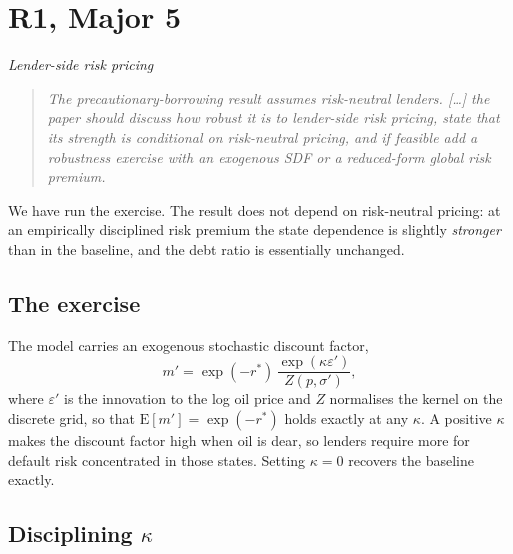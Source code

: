 
\section{R1, Major 5}
{\itshape Lender-side risk pricing}

\begin{quote}\itshape
The precautionary-borrowing result assumes risk-neutral lenders. [\ldots] the
paper should discuss how robust it is to lender-side risk pricing, state that
its strength is conditional on risk-neutral pricing, and if feasible add a
robustness exercise with an exogenous SDF or a reduced-form global risk premium.
\end{quote}

We have run the exercise. The result does not depend on risk-neutral pricing:
at an empirically disciplined risk premium the state dependence is slightly
\emph{stronger} than in the baseline, and the debt ratio is essentially
unchanged.

\subsection*{The exercise}

The model carries an exogenous stochastic discount factor,
\[
  m' = \exp(-r^{*})\,\frac{\exp(\kappa\varepsilon')}{Z(p,\sigma')},
\]
where $\varepsilon'$ is the innovation to the log oil price and $Z$ normalises
the kernel on the discrete grid, so that $\mathrm{E}[m'] = \exp(-r^{*})$ holds
exactly at any $\kappa$. A positive $\kappa$ makes the discount factor high
when oil is dear, so lenders require more for default risk concentrated in those
states. Setting $\kappa = 0$ recovers the baseline exactly.

\subsection*{Disciplining $\kappa$}

